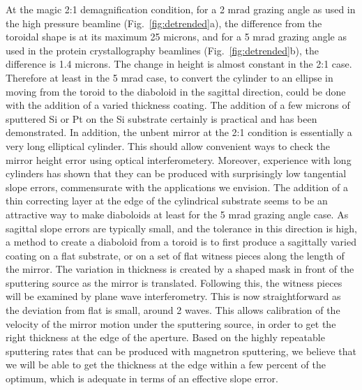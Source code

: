 \documentclass{iucr}              %
\begin{document}
At the magic 2:1 demagnification condition, for a 2 mrad grazing angle as used in the high pressure beamline (Fig.~\ref{fig:detrended}a), the difference from the toroidal shape is at its maximum 25 microns, and for a 5 mrad grazing angle as used in the protein crystallography beamlines (Fig.~\ref{fig:detrended}b), the difference is 1.4 microns.  The change in height is almost constant in the 2:1 case.  Therefore at least in the 5 mrad case, to convert the cylinder to an ellipse in moving from the toroid to the diaboloid in the sagittal direction, could be done with the addition of a varied thickness coating.  The addition of a few microns of sputtered Si or Pt on the Si substrate certainly is practical and has been demonstrated.  In addition, the unbent mirror at the 2:1 condition is essentially a very long elliptical cylinder.  This should allow convenient ways to check the mirror height error using optical interferometery.  Moreover, experience with long cylinders has shown that they can be produced with surprisingly low tangential slope errors, commensurate with the applications we envision.  The addition of a thin correcting layer at the edge of the cylindrical substrate seems to be an attractive way to make diaboloids at least for the 5 mrad grazing angle case. As sagittal slope errors are typically small, and the tolerance in this direction is high, a method to create a diaboloid from a toroid is to first produce a sagittally varied coating on a flat substrate, or on a set of flat witness pieces along the length of the mirror.  The variation in thickness is created by a shaped mask in front of the sputtering source as the mirror is translated.  Following this, the witness pieces will be examined by plane wave interferometry.  This is now straightforward as the deviation from flat is small, around 2 waves.  This allows calibration of the velocity of the mirror motion under the sputtering source, in order to get the right thickness at the edge of the aperture.  Based on the highly repeatable sputtering rates that can be produced with magnetron sputtering, we believe that we will be able to get the thickness at the edge within a few percent of the optimum, which is adequate in terms of an effective slope error. 
\end{document}
